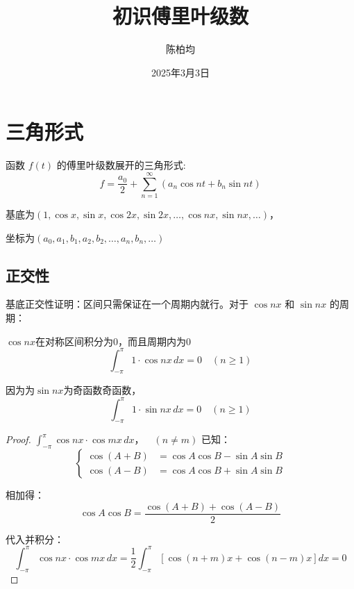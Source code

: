 \documentclass[12pt,a4paper]{article}
\title{初识傅里叶级数}
\author{陈柏均}
\date{2025年3月3日}
\numberwithin{subsection}{section}   %
\numberwithin{subsubsection}{subsection}
\theoremstyle{plain}
\theoremstyle{definition}
\theoremstyle{remark}
\theoremstyle{remark}
\begin{document}
	\maketitle
	
	\tableofcontents  %
	
	\newpage

\section{三角形式}
函数 \( f(t) \) 的傅里叶级数展开的三角形式:
\begin{equation}
	f = \frac{a_0}{2} + \sum_{n=1}^{\infty} \left( a_n \cos nt + b_n \sin nt \right)
\end{equation}

基底为$(1, \cos x, \sin x, \cos 2x, \sin 2x, \ldots, \cos nx, \sin nx, \ldots)$，

坐标为$(a_0, a_1, b_1, a_2,  b_2, \ldots, a_n, b_n, \ldots)$



\subsection{正交性}


基底正交性证明：区间只需保证在一个周期内就行。对于 \(\cos nx\) 和 \(\sin nx\) 的周期：


$\cos nx$在对称区间积分为0，而且周期内为0
\begin{equation}
\int_{-\pi}^{\pi} 1 \cdot \cos nx \, dx = 0 \quad (n \geq 1)
\end{equation}

因为为$\sin nx$为奇函数奇函数，
\begin{equation}
\int_{-\pi}^{\pi} 1 \cdot \sin nx \, dx = 0 \quad (n \geq 1)
\end{equation}


\begin{proof}$\int_{-\pi}^{\pi} \cos nx \cdot \cos mx \, dx ， \quad (n \neq m)$
已知：
\begin{equation}
	\left\{
	\begin{aligned}
		\cos(A + B) &= \cos A \cos B - \sin A \sin B \\[8pt]
		\cos(A - B) &= \cos A \cos B + \sin A \sin B
	\end{aligned}
	\right.
\end{equation}

相加得：
\begin{equation}
	\cos A \cos B = \frac{\cos(A + B) + \cos(A - B)}{2}
\end{equation}

代入并积分：
\begin{equation}
	\int_{-\pi}^{\pi} \cos nx \cdot \cos mx \, dx = \frac{1}{2} \int_{-\pi}^{\pi} \left[ \cos(n + m)x + \cos(n - m)x \right] dx = 0 
\end{equation}
\end{proof}
\end{document}
